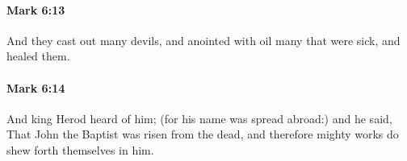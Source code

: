 		\paragraph{Mark 6:13} %
			\label{MARK-6-13}

			And they cast out many devils, and anointed with oil many that were sick, and healed them.

			\begin{framed}
			\scriptsize
				\begin{compactdesc}
					\item[SBLG] 
				\end{compactdesc}
			\end{framed}

		\paragraph{Mark 6:14} %
			\label{MARK-6-14}

			And king Herod heard of him; (for his name was spread abroad:) and he said, That John the Baptist was risen from the dead, and therefore mighty works do shew forth themselves in him.

